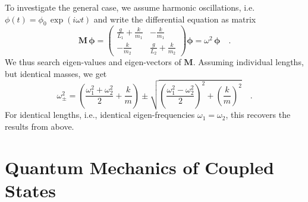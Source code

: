 To investigate the general case, we assume harmonic oscillations, i.e. $\phi(t) = \phi_0 \, \exp (i \omega t)$ and write the differential equation as matrix
\begin{equation} \boldsymbol{M \, \phi}	 = 
\begin{pmatrix}
  \frac{g}{L_1} +  \frac{k}{m_1}&  - \frac{k}{m_1}\\
 - \frac{k}{m_2} &  \frac{g}{L_2} +  \frac{k}{m_2}
\end{pmatrix}  \boldsymbol{\phi}	= \omega^2   \, \boldsymbol{\phi}
\quad .
\end{equation}
We thus search eigen-values and eigen-vectors of  $\boldsymbol{M}$. Assuming individual lengths, but identical masses, we get
\begin{equation}
 \omega_{\pm}^2 = \left( \frac{\omega_1^2 + \omega_2^2}{2}  + \frac{k}{m} \right)
  \pm \sqrt{  \left( \frac{\omega_1^2 - \omega_2^2}{2}   \right)^2 + \left(  \frac{k}{m} \right)^2 } \quad .
\end{equation}
For identical lengths, i.e., identical eigen-frequencies $\omega_1 = \omega_2$, this recovers the results from above.


\section{Quantum Mechanics of Coupled States}

